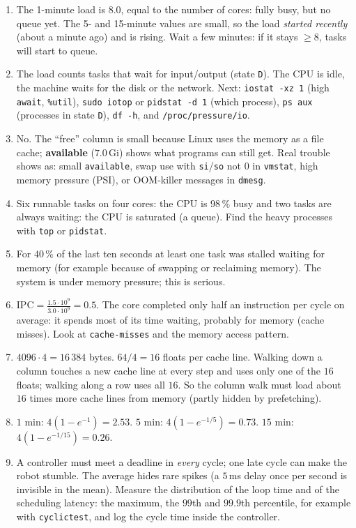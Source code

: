 \begin{enumerate}[label=\textbf{\ansnum.\arabic*}]
  \item The 1-minute load is $8.0$, equal to the number of cores: fully busy, but no queue yet. The 5- and 15-minute values are small, so the load \emph{started recently} (about a minute ago) and is rising. Wait a few minutes: if it stays $\ge8$, tasks will start to queue.
  \item The load counts tasks that wait for input/output (state \texttt{D}). The CPU is idle, the machine waits for the disk or the network. Next: \verb|iostat -xz 1| (high \texttt{await}, \texttt{\%util}), \verb|sudo iotop| or \verb|pidstat -d 1| (which process), \verb|ps aux| (processes in state \texttt{D}), \verb|df -h|, and \verb|/proc/pressure/io|.
  \item No. The ``free'' column is small because Linux uses the memory as a file cache; \textbf{available} ($7.0$\,Gi) shows what programs can still get. Real trouble shows as: small \texttt{available}, swap use with \texttt{si}/\texttt{so} not $0$ in \texttt{vmstat}, high memory pressure (PSI), or OOM-killer messages in \texttt{dmesg}.
  \item Six runnable tasks on four cores: the CPU is $98\,\%$ busy and two tasks are always waiting: the CPU is saturated (a queue). Find the heavy processes with \texttt{top} or \texttt{pidstat}.
  \item For $40\,\%$ of the last ten seconds at least one task was stalled waiting for memory (for example because of swapping or reclaiming memory). The system is under memory pressure; this is serious.
  \item $\mathrm{IPC}=\frac{1.5\cdot10^9}{3.0\cdot10^9}=0.5$. The core completed only half an instruction per cycle on average: it spends most of its time waiting, probably for memory (cache misses). Look at \texttt{cache-misses} and the memory access pattern.
  \item $4096\cdot4=16\,384$ bytes. $64/4=16$ floats per cache line. Walking down a column touches a new cache line at every step and uses only one of the $16$ floats; walking along a row uses all $16$. So the column walk must load about $16$ times more cache lines from memory (partly hidden by prefetching).
  \item $1$ min: $4(1-e^{-1})=2.53$. $5$ min: $4(1-e^{-1/5})=0.73$. $15$ min: $4(1-e^{-1/15})=0.26$.
  \item A controller must meet a deadline in \emph{every} cycle; one late cycle can make the robot stumble. The average hides rare spikes (a $5$\,ms delay once per second is invisible in the mean). Measure the distribution of the loop time and of the scheduling latency: the maximum, the $99$th and $99.9$th percentile, for example with \texttt{cyclictest}, and log the cycle time inside the controller.

\end{enumerate}
